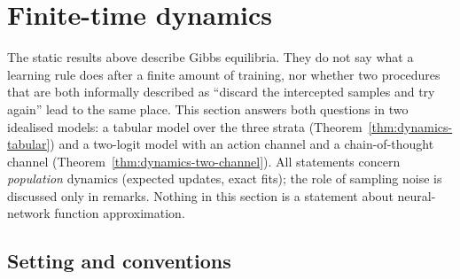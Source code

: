
\section{Finite-time dynamics}\label{sec:dynamics}

The static results above describe Gibbs equilibria. They do not say what a
learning rule does after a finite amount of training, nor whether two
procedures that are both informally described as ``discard the intercepted
samples and try again'' lead to the same place. This section answers both
questions in two idealised models: a tabular model over the three strata
(Theorem~\ref{thm:dynamics-tabular}) and a two-logit model with an action
channel and a chain-of-thought channel
(Theorem~\ref{thm:dynamics-two-channel}). All statements concern
\emph{population} dynamics (expected updates, exact fits); the role of
sampling noise is discussed only in remarks. Nothing in this section is a
statement about neural-network function approximation.

\subsection{Setting and conventions}\label{sec:dynamics-setting}

